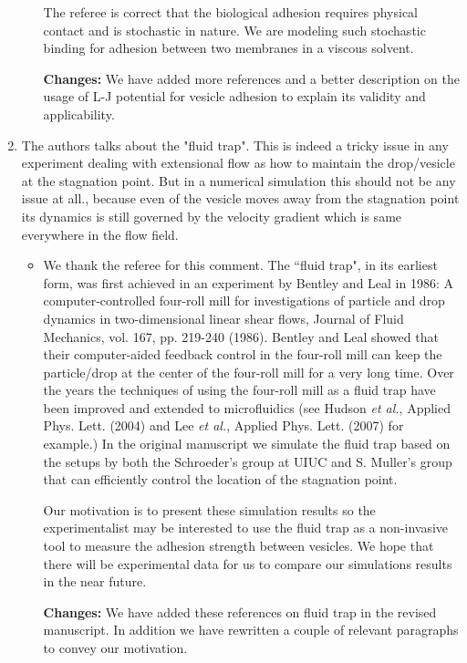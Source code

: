 \documentclass[11pt]{article}
\newcommand{\comment}[1]{{\color{blue} #1}}
\begin{document}
\begin{enumerate}
\begin{itemize}
  The referee is correct that the biological adhesion requires physical contact and is stochastic in nature. We are modeling such stochastic binding for adhesion between two membranes in a viscous solvent.
  
  \noindent
  {\bf Changes:} We have added more references and a better description on the usage of L-J potential for vesicle adhesion to explain its validity and applicability.
  
\end{itemize}

\noindent
\item\comment{The authors talks about the "fluid trap". This is indeed a tricky
issue in any experiment dealing with extensional flow as how to
maintain the drop/vesicle at the stagnation point. But in a numerical
simulation this should not be any issue at all., because even of the
vesicle moves away from the stagnation point its dynamics is still
governed by the velocity gradient which is same everywhere in the flow
field.}
\begin{itemize}
  \item We thank the referee for this comment. The ``fluid trap", in its earliest form, was first achieved in an experiment by Bentley and Leal in 1986: A computer-controlled four-roll mill for
  investigations  of particle and drop dynamics in two-dimensional linear shear flows, Journal of Fluid Mechanics, vol. 167, pp. 219-240 (1986).  Bentley and Leal showed that their computer-aided feedback control in the four-roll mill can keep the particle/drop at the center of the four-roll mill for a very long time.
  Over the years the techniques of using the four-roll mill as a fluid trap have been improved and extended to microfluidics (see Hudson {\it et al.}, Applied Phys. Lett. (2004) and Lee {\it et al.}, Applied Phys. Lett. (2007) for example.)
  In the original manuscript we simulate the fluid trap based on the setups by both the Schroeder's group at UIUC and S. Muller's group that can efficiently control the location of the stagnation point. 
  
  Our motivation is to present these simulation results so the experimentalist may be interested to use the fluid trap as a non-invasive tool to measure the adhesion strength between vesicles. We hope that there will be experimental data for us to compare our simulations results in the near future.
  
   \noindent
  {\bf Changes:} We have added these references on fluid trap in the revised manuscript. In addition we have rewritten a couple of relevant paragraphs to convey our motivation.
 \end{itemize}



\end{enumerate}
\end{document}
